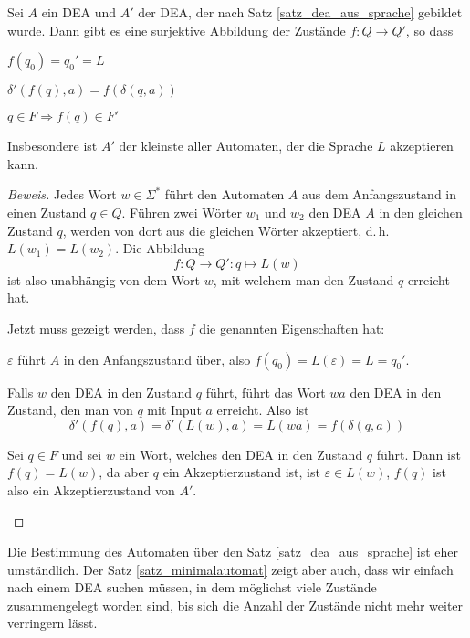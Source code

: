 \begin{satz}[Minimalautomat]\label{satz_minimalautomat}
Sei $A$ ein DEA und $A'$ der DEA, der nach
Satz \ref{satz_dea_aus_sprache} gebildet wurde.
Dann gibt es eine surjektive Abbildung der Zustände $f\colon Q\to Q'$, so dass
\begin{compactenum}
\item $f(q_0)=q_0'=L$
\item $\delta'(f(q),a)=f(\delta(q,a))$
\item $q\in F\Rightarrow f(q)\in F'$
\end{compactenum}
Insbesondere ist $A'$ der kleinste aller Automaten, der die Sprache
$L$ akzeptieren kann.
\end{satz}

\begin{proof}[Beweis]
Jedes Wort $w\in\Sigma^*$ führt den Automaten $A$ aus dem
Anfangszustand in einen Zustand $q\in Q$.
Führen zwei Wörter $w_1$ und $w_2$ den DEA $A$ in den gleichen Zustand $q$,
werden von dort aus die gleichen Wörter akzeptiert, d.\,h.~$L(w_1)=L(w_2)$.
Die Abbildung
\[
f\colon Q\to Q': q\mapsto L(w)
\]
ist also unabhängig von dem Wort $w$, mit welchem man den Zustand $q$
erreicht hat.

Jetzt muss gezeigt werden, dass $f$ die genannten Eigenschaften hat:
\begin{compactenum}
\item
$\varepsilon$ führt $A$ in den Anfangszustand über, also
$f(q_0)=L(\varepsilon)=L=q_0'$.
\item Falls $w$ den DEA in den Zustand $q$ führt, führt das Wort
$wa$ den DEA in den Zustand, den man von $q$ mit Input $a$ erreicht.
Also ist
\[
\delta'(f(q),a)=\delta'(L(w), a)=L(wa)=f(\delta(q,a))
\]
\item Sei $q\in F$ und sei $w$ ein Wort, welches den DEA in den Zustand 
$q$ führt.
Dann ist $f(q)=L(w)$, da aber $q$ ein Akzeptierzustand ist,
ist $\varepsilon\in L(w)$, $f(q)$ ist also ein Akzeptierzustand von
$A'$.
\qedhere
\end{compactenum}
\end{proof}

Die Bestimmung des Automaten über den Satz \ref{satz_dea_aus_sprache}
ist eher umständlich.
Der Satz \ref{satz_minimalautomat} zeigt
aber auch, dass wir einfach nach einem DEA suchen müssen, in dem
möglichst viele Zustände zusammengelegt worden sind, bis sich die
Anzahl der Zustände nicht mehr weiter verringern lässt.

